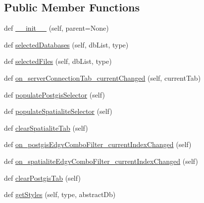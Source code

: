 \subsection*{Public Member Functions}
\begin{DoxyCompactItemize}
\item 
def \mbox{\hyperlink{class_dsg_tools_1_1_custom_widgets_1_1custom_server_connection_widget_1_1_custom_server_connection_widget_aa7f6b461949b51f4ec42def1d4c17327}{\+\_\+\+\_\+init\+\_\+\+\_\+}} (self, parent=None)
\item 
def \mbox{\hyperlink{class_dsg_tools_1_1_custom_widgets_1_1custom_server_connection_widget_1_1_custom_server_connection_widget_a6292041487c522474161338a4394b0fc}{selected\+Databases}} (self, db\+List, type)
\item 
def \mbox{\hyperlink{class_dsg_tools_1_1_custom_widgets_1_1custom_server_connection_widget_1_1_custom_server_connection_widget_aac7156461aa00347401631dd83460aa6}{selected\+Files}} (self, db\+List, type)
\item 
def \mbox{\hyperlink{class_dsg_tools_1_1_custom_widgets_1_1custom_server_connection_widget_1_1_custom_server_connection_widget_a6473464a7e28aba05243cbdbcc33901c}{on\+\_\+server\+Connection\+Tab\+\_\+current\+Changed}} (self, current\+Tab)
\item 
def \mbox{\hyperlink{class_dsg_tools_1_1_custom_widgets_1_1custom_server_connection_widget_1_1_custom_server_connection_widget_a341f5f3c8f937125ec2afffa8e465f9b}{populate\+Postgis\+Selector}} (self)
\item 
def \mbox{\hyperlink{class_dsg_tools_1_1_custom_widgets_1_1custom_server_connection_widget_1_1_custom_server_connection_widget_a71cabf4c45973462d4b640dae4feb911}{populate\+Spatialite\+Selector}} (self)
\item 
def \mbox{\hyperlink{class_dsg_tools_1_1_custom_widgets_1_1custom_server_connection_widget_1_1_custom_server_connection_widget_a9692467a0f69f7a6337ca6eaa64f6913}{clear\+Spatialite\+Tab}} (self)
\item 
def \mbox{\hyperlink{class_dsg_tools_1_1_custom_widgets_1_1custom_server_connection_widget_1_1_custom_server_connection_widget_ab1fca683356075547358dd8ac946d81b}{on\+\_\+postgis\+Edgv\+Combo\+Filter\+\_\+current\+Index\+Changed}} (self)
\item 
def \mbox{\hyperlink{class_dsg_tools_1_1_custom_widgets_1_1custom_server_connection_widget_1_1_custom_server_connection_widget_a898eb22f884d04acd26f6e35af11362e}{on\+\_\+spatialite\+Edgv\+Combo\+Filter\+\_\+current\+Index\+Changed}} (self)
\item 
def \mbox{\hyperlink{class_dsg_tools_1_1_custom_widgets_1_1custom_server_connection_widget_1_1_custom_server_connection_widget_af285045bf31e711bf23cc6641f64c19d}{clear\+Postgis\+Tab}} (self)
\item 
def \mbox{\hyperlink{class_dsg_tools_1_1_custom_widgets_1_1custom_server_connection_widget_1_1_custom_server_connection_widget_ab1d6b7c046e369541cd3899f4899c73d}{get\+Styles}} (self, type, abstract\+Db)
\end{DoxyCompactItemize}
